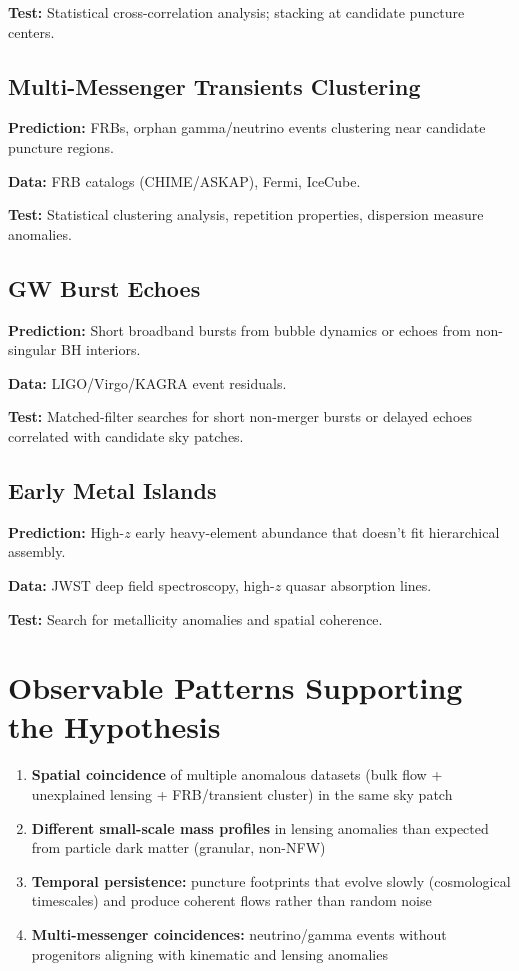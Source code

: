 \documentclass[11pt,a4paper]{article}
\begin{document}
\textbf{Test:} Statistical cross-correlation analysis; stacking at candidate puncture centers.

\subsection{Multi-Messenger Transients Clustering}

\textbf{Prediction:} FRBs, orphan gamma/neutrino events clustering near candidate puncture regions.

\textbf{Data:} FRB catalogs (CHIME/ASKAP), Fermi, IceCube.

\textbf{Test:} Statistical clustering analysis, repetition properties, dispersion measure anomalies.

\subsection{GW Burst Echoes}

\textbf{Prediction:} Short broadband bursts from bubble dynamics or echoes from non-singular BH interiors.

\textbf{Data:} LIGO/Virgo/KAGRA event residuals.

\textbf{Test:} Matched-filter searches for short non-merger bursts or delayed echoes correlated with candidate sky patches.

\subsection{Early Metal Islands}

\textbf{Prediction:} High-$z$ early heavy-element abundance that doesn't fit hierarchical assembly.

\textbf{Data:} JWST deep field spectroscopy, high-$z$ quasar absorption lines.

\textbf{Test:} Search for metallicity anomalies and spatial coherence.

\section{Observable Patterns Supporting the Hypothesis}

\begin{enumerate}
\item \textbf{Spatial coincidence} of multiple anomalous datasets (bulk flow + unexplained lensing + FRB/transient cluster) in the same sky patch
\item \textbf{Different small-scale mass profiles} in lensing anomalies than expected from particle dark matter (granular, non-NFW)
\item \textbf{Temporal persistence:} puncture footprints that evolve slowly (cosmological timescales) and produce coherent flows rather than random noise
\item \textbf{Multi-messenger coincidences:} neutrino/gamma events without progenitors aligning with kinematic and lensing anomalies
\end{enumerate}
\end{document}
